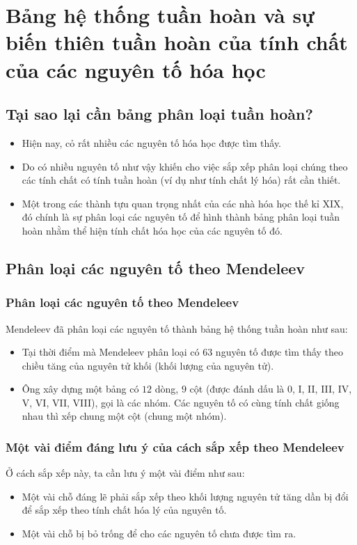 \chapter{Bảng hệ thống tuần hoàn và sự biến thiên tuần hoàn của tính chất của các nguyên tố hóa học}
\section{Tại sao lại cần bảng phân loại tuần hoàn?}
\begin{itemize}
\item Hiện nay, cỏ rất nhiều các nguyên tố hóa học được tìm thấy.
\item Do có nhiều nguyên tố như vậy khiến cho việc sắp xếp phân loại chúng theo các tính chất có tính tuần hoàn (ví dụ như tính chất lý hóa) rất cần thiết.
\item Một trong các thành tựu quan trọng nhất của các nhà hóa học thế kỉ XIX, đó chính là sự phân loại các nguyên tố để hình thành bảng phân loại tuần hoàn nhằm thể hiện tính chất hóa học của các nguyên tố đó.
\end{itemize}
\section{Phân loại các nguyên tố theo Mendeleev}
\subsection{Phân loại các nguyên tố theo Mendeleev}
Mendeleev đã phân loại các nguyên tố thành bảng hệ thống tuần hoàn như sau:
\begin{itemize}
\item Tại thời điểm mà Mendeleev phân loại có $63$ nguyên tố được tìm thấy theo chiều tăng của nguyên tử khối (khối lượng của nguyên tử).
\item Ông xây dựng một bảng có $12$ dòng, $9$ cột (được đánh dấu là 0, I, II, III, IV, V, VI, VII, VIII), gọi là các nhóm. Các nguyên tố có cùng tính chất giống nhau thì xếp chung một cột (chung một nhóm).
\end{itemize}
\subsection{Một vài điểm đáng lưu ý của cách sắp xếp theo Mendeleev}
Ở cách sắp xếp này, ta cần lưu ý một vài điểm như sau:
\begin{itemize}
\item Một vài chỗ đáng lẽ phải sắp xếp theo khối lượng nguyên tử tăng dần bị đổi để sắp xếp theo tính chất hóa lý của nguyên tố.
\item Một vài chỗ bị bỏ trống để cho các nguyên tố chưa được tìm ra.
\end{itemize}
